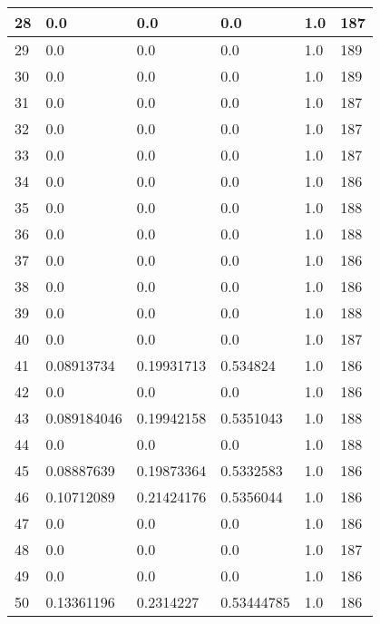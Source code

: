 \begin{longtable}{|l|l|l|l|l|l|}
28 & 0.0 & 0.0 & 0.0 & 1.0 & 187 \\ \hline 
29 & 0.0 & 0.0 & 0.0 & 1.0 & 189 \\ \hline 
30 & 0.0 & 0.0 & 0.0 & 1.0 & 189 \\ \hline 
31 & 0.0 & 0.0 & 0.0 & 1.0 & 187 \\ \hline 
32 & 0.0 & 0.0 & 0.0 & 1.0 & 187 \\ \hline 
33 & 0.0 & 0.0 & 0.0 & 1.0 & 187 \\ \hline 
34 & 0.0 & 0.0 & 0.0 & 1.0 & 186 \\ \hline 
35 & 0.0 & 0.0 & 0.0 & 1.0 & 188 \\ \hline 
36 & 0.0 & 0.0 & 0.0 & 1.0 & 188 \\ \hline 
37 & 0.0 & 0.0 & 0.0 & 1.0 & 186 \\ \hline 
38 & 0.0 & 0.0 & 0.0 & 1.0 & 186 \\ \hline 
39 & 0.0 & 0.0 & 0.0 & 1.0 & 188 \\ \hline 
40 & 0.0 & 0.0 & 0.0 & 1.0 & 187 \\ \hline 
41 & 0.08913734 & 0.19931713 & 0.534824 & 1.0 & 186 \\ \hline 
42 & 0.0 & 0.0 & 0.0 & 1.0 & 186 \\ \hline 
43 & 0.089184046 & 0.19942158 & 0.5351043 & 1.0 & 188 \\ \hline 
44 & 0.0 & 0.0 & 0.0 & 1.0 & 188 \\ \hline 
45 & 0.08887639 & 0.19873364 & 0.5332583 & 1.0 & 186 \\ \hline 
46 & 0.10712089 & 0.21424176 & 0.5356044 & 1.0 & 186 \\ \hline 
47 & 0.0 & 0.0 & 0.0 & 1.0 & 186 \\ \hline 
48 & 0.0 & 0.0 & 0.0 & 1.0 & 187 \\ \hline 
49 & 0.0 & 0.0 & 0.0 & 1.0 & 186 \\ \hline 
50 & 0.13361196 & 0.2314227 & 0.53444785 & 1.0 & 186 \\ \hline 
\end{longtable}
